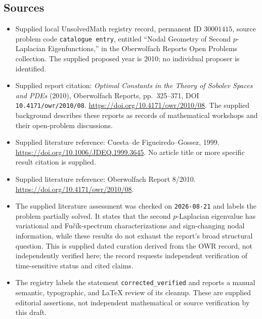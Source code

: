\documentclass[11pt]{article}
\begin{document}
\subsection{Sources}
\begin{itemize}
\item Supplied local UnsolvedMath registry record, permanent ID \(30001415\), source problem code \texttt{catalogue entry}, entitled ``Nodal Geometry of Second \(p\)-Laplacian Eigenfunctions,'' in the Oberwolfach Reports Open Problems collection. The supplied proposed year is 2010; no individual proposer is identified.
\item Supplied report citation: \emph{Optimal Constants in the Theory of Sobolev Spaces and PDEs} (2010), Oberwolfach Reports, pp.~325--371, DOI \texttt{10.4171/owr/2010/08}. \url{https://doi.org/10.4171/owr/2010/08}. The supplied background describes these reports as records of mathematical workshops and their open-problem discussions.
\item Supplied literature reference: Cuesta--de Figueiredo--Gossez, 1999. \url{https://doi.org/10.1006/JDEQ.1999.3645}. No article title or more specific result citation is supplied.
\item Supplied literature reference: Oberwolfach Report 8/2010. \url{https://doi.org/10.4171/owr/2010/08}.
\item The supplied literature assessment was checked on \texttt{2026-08-21} and labels the problem partially solved. It states that the second \(p\)-Laplacian eigenvalue has variational and Fu\v{c}\'{i}k-spectrum characterizations and sign-changing nodal information, while these results do not exhaust the report's broad structural question. This is supplied dated curation derived from the OWR record, not independently verified here; the record requests independent verification of time-sensitive status and cited claims.
\item The registry labels the statement \texttt{corrected\_verified} and reports a manual semantic, typographic, and LaTeX review of its cleanup. These are supplied editorial assertions, not independent mathematical or source verification by this draft.
\end{itemize}
\end{document}
